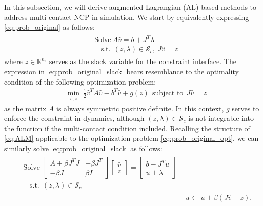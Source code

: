 \documentclass[lettersize,journal]{IEEEtran}
\begin{document}
In this subsection, we will derive augmented Lagrangian (AL) based methods to address multi-contact NCP in simulation.
We start by equivalently expressing \eqref{eq:prob_original} as follows:
\begin{align} \label{eq:prob_original_slack}
\begin{split}
    &\text{Solve}~A\hat{v} = b + J^T\lambda\\
    &~~~~\text{s.t.}~~(z,\lambda)\in \mathcal{S}_c,~J\hat{v} = z
\end{split}
\end{align}
where $z\in\mathbb{R}^{n_c}$ serves as the slack variable for the constraint interface. The expression in \eqref{eq:prob_original_slack} bears resemblance to the optimality condition of the following optimization problem:
\begin{align} \label{eq:prob_original_opt}
&\min_{\hat{v},z}~\frac{1}{2}\hat{v}^TA\hat{v} - b^T\hat{v} + g(z)~~\text{subject to}~~J\hat{v} = z
\end{align}
as the matrix $A$ is always symmetric positive definite. In this context, $g$ serves to enforce the constraint in dynamics, although $(z,\lambda)\in\mathcal{S}_c$ is not integrable into the function if the multi-contact condition included.
Recalling the structure of \eqref{eq:ALM} applicable to the optimization problem \eqref{eq:prob_original_opt}, we can similarly solve \eqref{eq:prob_original_slack} as follows:
\begin{align} 
\begin{split}
&\text{Solve }
\begin{bmatrix}
A+\beta J^TJ & -\beta J^T \\
-\beta J & \beta I
\end{bmatrix}
\begin{bmatrix}
\hat{v} \\ z
\end{bmatrix}
=
\begin{bmatrix}
b-J^Tu \\ u + \lambda
\end{bmatrix} \\
&~~~~\text{s.t.}~~
(z,\lambda)\in\mathcal{S}_c \label{eq:prob_surrogate}
\end{split}
\\
&u \leftarrow u + \beta(J\hat{v}-z). \label{eq:AL_multiplier_update}
\end{align}
\end{document}
